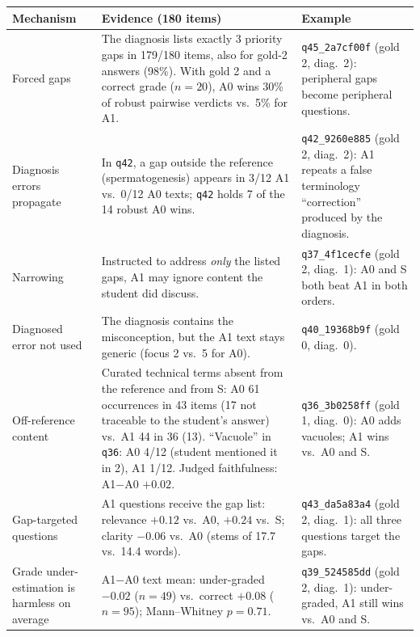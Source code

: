 \begin{tabular}{p{}p{}p{}}
\toprule
Mechanism & Evidence (180 items) & Example \\
\midrule
Forced gaps & The diagnosis lists exactly 3 priority gaps in 179/180 items, also for gold-2 answers (98\%). With gold 2 and a correct grade ($n{=}20$), A0 wins 30\% of robust pairwise verdicts vs.\ 5\% for A1. & \texttt{q45\_2a7cf00f} (gold 2, diag.\ 2): peripheral gaps become peripheral questions. \\
Diagnosis errors propagate & In \texttt{q42}, a gap outside the reference (spermatogenesis) appears in 3/12 A1 vs.\ 0/12 A0 texts; \texttt{q42} holds 7 of the 14 robust A0 wins. & \texttt{q42\_9260e885} (gold 2, diag.\ 2): A1 repeats a false terminology ``correction'' produced by the diagnosis. \\
Narrowing & Instructed to address \emph{only} the listed gaps, A1 may ignore content the student did discuss. & \texttt{q37\_4f1cecfe} (gold 2, diag.\ 1): A0 and S both beat A1 in both orders. \\
Diagnosed error not used & The diagnosis contains the misconception, but the A1 text stays generic (focus 2 vs.\ 5 for A0). & \texttt{q40\_19368b9f} (gold 0, diag.\ 0). \\
Off-reference content & Curated technical terms absent from the reference and from S: A0 61 occurrences in 43 items (17 not traceable to the student's answer) vs.\ A1 44 in 36 (13). ``Vacuole'' in \texttt{q36}: A0 4/12 (student mentioned it in 2), A1 1/12. Judged faithfulness: A1$-$A0 $+0.02$. & \texttt{q36\_3b0258ff} (gold 1, diag.\ 0): A0 adds vacuoles; A1 wins vs.\ A0 and S. \\
Gap-targeted questions & A1 questions receive the gap list: relevance $+0.12$ vs.\ A0, $+0.24$ vs.\ S; clarity $-0.06$ vs.\ A0 (stems of 17.7 vs.\ 14.4 words). & \texttt{q43\_da5a83a4} (gold 2, diag.\ 1): all three questions target the gaps. \\
Grade under-estimation is harmless on average & A1$-$A0 text mean: under-graded $-0.02$ ($n{=}49$) vs.\ correct $+0.08$ ($n{=}95$); Mann--Whitney $p{=}0.71$. & \texttt{q39\_524585dd} (gold 2, diag.\ 1): under-graded, A1 still wins vs.\ A0 and S. \\
\bottomrule
\end{tabular}
